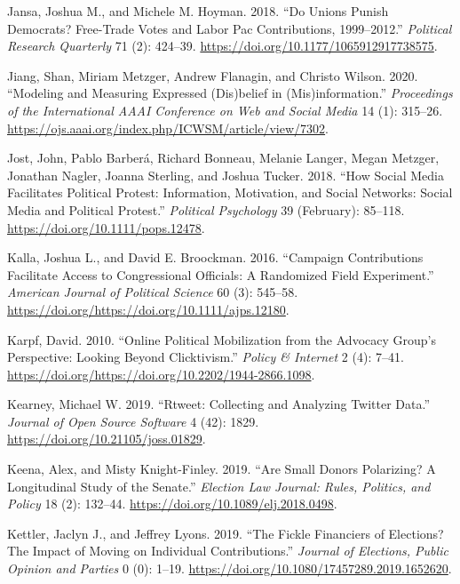 \documentclass[12pt,]{article}
\begin{document}
\leavevmode\hypertarget{ref-jansa2018}{}%
Jansa, Joshua M., and Michele M. Hoyman. 2018. ``Do Unions Punish
Democrats? Free-Trade Votes and Labor Pac Contributions, 1999--2012.''
\emph{Political Research Quarterly} 71 (2): 424--39.
\url{https://doi.org/10.1177/1065912917738575}.

\leavevmode\hypertarget{ref-jiang2020}{}%
Jiang, Shan, Miriam Metzger, Andrew Flanagin, and Christo Wilson. 2020.
``Modeling and Measuring Expressed (Dis)belief in (Mis)information.''
\emph{Proceedings of the International AAAI Conference on Web and Social
Media} 14 (1): 315--26.
\url{https://ojs.aaai.org/index.php/ICWSM/article/view/7302}.

\leavevmode\hypertarget{ref-jost2018}{}%
Jost, John, Pablo Barberá, Richard Bonneau, Melanie Langer, Megan
Metzger, Jonathan Nagler, Joanna Sterling, and Joshua Tucker. 2018.
``How Social Media Facilitates Political Protest: Information,
Motivation, and Social Networks: Social Media and Political Protest.''
\emph{Political Psychology} 39 (February): 85--118.
\url{https://doi.org/10.1111/pops.12478}.

\leavevmode\hypertarget{ref-kalla2016}{}%
Kalla, Joshua L., and David E. Broockman. 2016. ``Campaign Contributions
Facilitate Access to Congressional Officials: A Randomized Field
Experiment.'' \emph{American Journal of Political Science} 60 (3):
545--58. \url{https://doi.org/https://doi.org/10.1111/ajps.12180}.

\leavevmode\hypertarget{ref-karpf2010}{}%
Karpf, David. 2010. ``Online Political Mobilization from the Advocacy
Group's Perspective: Looking Beyond Clicktivism.'' \emph{Policy \&
Internet} 2 (4): 7--41.
\url{https://doi.org/https://doi.org/10.2202/1944-2866.1098}.

\leavevmode\hypertarget{ref-rtweet}{}%
Kearney, Michael W. 2019. ``Rtweet: Collecting and Analyzing Twitter
Data.'' \emph{Journal of Open Source Software} 4 (42): 1829.
\url{https://doi.org/10.21105/joss.01829}.

\leavevmode\hypertarget{ref-keena2019}{}%
Keena, Alex, and Misty Knight-Finley. 2019. ``Are Small Donors
Polarizing? A Longitudinal Study of the Senate.'' \emph{Election Law
Journal: Rules, Politics, and Policy} 18 (2): 132--44.
\url{https://doi.org/10.1089/elj.2018.0498}.

\leavevmode\hypertarget{ref-kettler2019}{}%
Kettler, Jaclyn J., and Jeffrey Lyons. 2019. ``The Fickle Financiers of
Elections? The Impact of Moving on Individual Contributions.''
\emph{Journal of Elections, Public Opinion and Parties} 0 (0): 1--19.
\url{https://doi.org/10.1080/17457289.2019.1652620}.
\end{document}
